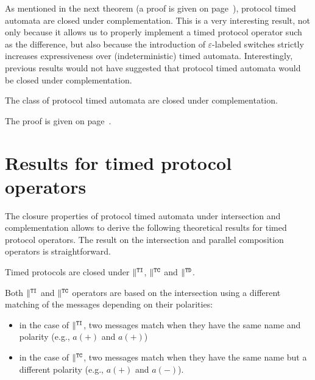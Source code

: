 As mentioned in the next theorem (a proof is given on page~\pageref{proof:closure-complement}), protocol timed automata are closed under complementation. This is a very interesting result, not only because it allows us to properly implement a timed protocol operator such as the difference, but also because the introduction of $\varepsilon$-labeled switches strictly increases expressiveness over (indeterministic) timed automata. Interestingly, previous results would not have suggested that protocol timed automata would be closed under complementation.

\begin{theorem}
The class of protocol timed automata are closed under complementation.
\label{thm:closure-complement}
\end{theorem}

The proof is given on page~\pageref{proof:closure-complement}.


\section{Results for timed protocol operators}


The closure properties of protocol timed automata under intersection and complementation allows to derive the following theoretical results for timed protocol operators.
The result on the intersection and parallel composition operators is straightforward.

\begin{corollary}
Timed protocols are closed under $\parallel^{\mathtt{TI}}$, $\parallel^{\mathtt{TC}}$ and $\parallel^{\mathtt{TD}}$.
\end{corollary}

Both $\parallel^{\mathtt{TI}}$ and $\parallel^{\mathtt{TC}}$ operators are based on the intersection using a different matching of the messages depending on their polarities:
\begin{itemize}
  
  \item in the case of $\parallel^{\mathtt{TI}}$, two messages match when they have the same name and polarity (e.g., $a(+)$ and $a(+)$)
  
  \item in the case of $\parallel^{\mathtt{TC}}$, two messages match when they have the same name but a different polarity (e.g., $a(+)$ and $a(-)$).
  
\end{itemize}

